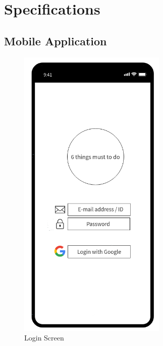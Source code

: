 \documentclass[conference]{IEEEtran}
\begin{document}
\section{Specifications}
\subsection{Mobile Application}

\begin{figure}[htp] \centering \includegraphics[width=200pt]{mockup_login} \caption{Login Screen} \label{fig:login} \end{figure}
\end{document}
